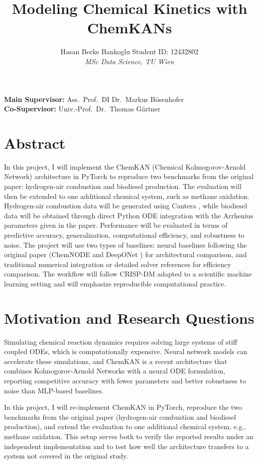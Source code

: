 \documentclass[11pt,a4paper]{article}
\title{\textbf{Modeling Chemical Kinetics with ChemKANs}}
\author{
  Hasan Berke Bankoglu \quad Student ID: 12432802 \\[4pt]
  \textit{MSc Data Science, TU Wien}
}
\date{}
\begin{document}
\maketitle
\vspace{-1em}

\noindent\textbf{Main Supervisor:} Ass.\ Prof.\ DI Dr.\ Markus B\"osenhofer \\
\textbf{Co-Supervisor:} Univ.-Prof.\ Dr.\ Thomas G\"artner

\section*{Abstract}

In this project, I will implement the ChemKAN (Chemical Kolmogorov-Arnold Network) \cite{Koenig_2025} architecture in PyTorch to reproduce two benchmarks from the original paper: hydrogen-air combustion and biodiesel production. The evaluation will then be extended to one additional chemical system, such as methane oxidation. Hydrogen-air combustion data will be generated using Cantera \cite{cantera}, while biodiesel data will be obtained through direct Python ODE integration with the Arrhenius parameters given in the paper. Performance will be evaluated in terms of predictive accuracy, generalization, computational efficiency, and robustness to noise. The project will use two types of baselines: neural baselines following the original paper (ChemNODE \cite{OWOYELE2022100118} and DeepONet \cite{lu2019deeponet}) for architectural comparison, and traditional numerical integration or detailed solver references for efficiency comparison. The workflow will follow CRISP-DM adapted to a scientific machine learning setting and will emphasize reproducible computational practice.

\section*{Motivation and Research Questions}

Simulating chemical reaction dynamics requires solving large systems of stiff coupled ODEs, which is computationally expensive. Neural network models can accelerate these simulations, and ChemKAN \cite{Koenig_2025} is a recent architecture that combines Kolmogorov-Arnold Networks \cite{liu2025kankolmogorovarnoldnetworks} with a neural ODE formulation, reporting competitive accuracy with fewer parameters and better robustness to noise than MLP-based baselines.

\noindent In this project, I will re-implement ChemKAN \cite{Koenig_2025} in PyTorch, reproduce the two benchmarks from the original paper (hydrogen-air combustion and biodiesel production), and extend the evaluation to one additional chemical system, e.g., methane oxidation. This setup serves both to verify the reported results under an independent implementation and to test how well the architecture transfers to a system not covered in the original study.
\end{document}
